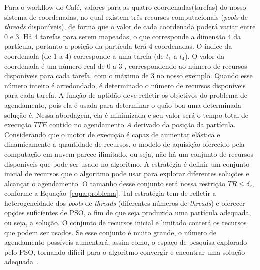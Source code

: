 Para o workflow do Café, valores para as quatro coordenadas(tarefas) do nosso sistema de coordenadas, no qual existem três recursos computacionais (\emph{pools} de \emph{threads} disponíveis), de forma que o valor de cada coordenada poderá variar entre 0 e 3. Há 4 tarefas para serem mapeadas, o que corresponde a dimensão 4 da partícula, portanto a posição da partícula terá 4 coordenadas. O índice da coordenada (de 1 a 4) corresponde a uma tarefa (de $t_1$ a $t_{4}$). O valor da coordenada é um número real de 0 a 3 , correspondendo ao número de recursos disponíveis para cada tarefa, com o máximo de 3 no nosso exemplo. Quando esse número inteiro é arredondado, é determinado o número de recursos disponíveis para cada tarefa. 
A função de aptidão deve refletir os objetivos do problema de agendamento, pois ela é usada para determinar o quão boa uma determinada solução é. Nessa abordagem, ela é minimizada e seu valor será o tempo total de execução $TTE$ contido no agendamento $A$ derivado da posição da partícula. Considerando que o motor de execução é capaz de aumentar elástica e dinamicamente a quantidade de recursos, o modelo de aquisição oferecido pela computação em nuvem parece ilimitado, ou seja, não há um conjunto de recursos disponíveis que pode ser usado no algoritmo. A estratégia é definir um conjunto inicial de recursos que o algoritmo pode usar para explorar diferentes soluções e alcançar o agendamento. O tamanho desse conjunto será nossa restrição ${TR \le {\delta _r}} $, conforme a Equação~\ref{equa:problema}. Tal estratégia tem de refletir a heterogeneidade dos \emph{pools} de \emph{threads} (diferentes números de \emph{threads}) e oferecer opções suficientes de PSO, a fim de que seja produzida uma partícula adequada, ou seja, a solução. O conjunto de recursos inicial e limitado conterá os recursos que podem ser usados. Se esse conjunto é muito grande, o número de agendamento possíveis aumentará, assim como, o espaço de pesquisa explorado pelo PSO, tornando difícil para o algoritmo convergir e encontrar uma solução adequada~\cite{rodriguez2014}.

